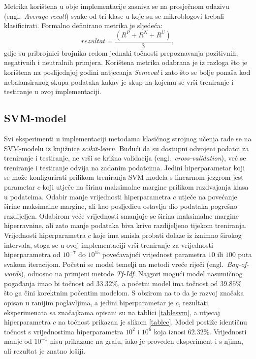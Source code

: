 \documentclass[times, utf8, zavrsni]{fer}
\begin{document}
Metrika korištena u obje implementacije zasniva se na prosječnom odazivu (engl.~\emph{Average recall}) svake od tri klase u koje su se mikroblogovi trebali klasificirati. Formalno definirano metrika je sljedeća: \[ \mathit{rezultat} = \frac{(R^P + R^N + R^U)}{3},\] gdje su pribrojnici brojnika redom jednaki točnosti prepoznavanja pozitivnih, negativnih i neutralnih primjera. Korištena metrika odabrana je iz razloga što je korištena na poslijednjoj godini natjecanja \emph{Semeval} i zato što se bolje ponaša kod nebalansiranog skupa podataka kakav je skup na kojemu se vrši treniranje i testiranje u ovoj implementaciji.

\subsection{\gls{SVM}-model}
Svi eksperimenti u implementaciji metodama klasičnog strojnog učenja rade se na \gls{SVM}-modelu iz knjižnice \emph{scikit-learn}. Budući da su dostupni odvojeni podatci za treniranje i testiranje, ne vrši se križna validacija (engl.~\emph{cross-validation}), već se treniranje i testiranje odvija na zadanim podatcima. Jedini hiperparametar koji se može konfigurirati prilikom treniranja \gls{SVM}-modela s linearnom jezgrom jest parametar $c$ koji utječe na širinu maksimalne margine prilikom razdvajanja klasa u podatcima. Odabir manje vrijednosti hiperparametra $c$ utječe na povećanje širine maksimalne margine, ali kao posljedicu ostavlja dio podataka pogrešno razdijeljen. Odabirom veće vrijednosti smanjuje se širina maksimalne margine hiperravnine, ali zato manje podataka biva krivo razdijeljeno tijekom treniranja. Vrijednosti hiperparametra $c$ koje ima smisla probati dolaze iz iznimno širokog intervala, stoga se u ovoj implementaciji vrši treniranje za vrijednosti hiperparametra od $10^{-7}$ do $10^{15}$ povećavajući vrijednost parametra $10$ ili $100$ puta svakom iteracijom. Početni se model temelji na metodi vreće riječi (engl.~\emph{Bag-of-words}), odnosno na primjeni metode \emph{Tf-Idf}. Najgori mogući model nasumičnog pogađanja imao bi točnost od $33.32\%$, a početni model ima točnost od $39.85\%$ što ga čini korektnim počentim modelom. S obzirom na to da je razvoj značaka opisan u ranijim poglavljima, a jedini hiperparametar je $c$, rezultati eksperimenata sa značajkama opisani su na tablici \ref{tablesvm}, a utjecaj hiperparametra $c$ na točnost prikazan je slikom \ref{tablec}. Model postiže identičnu točnost s vrijednostima hiperparametra $10^2$ i $10^6$ koja iznosi $62.32\%$. Vrijednosti manje od $10^{-1}$ nisu prikazane na grafu, iako je proveden eksperiment i s njima, ali rezultat je znatno lošiji.
\end{document}
